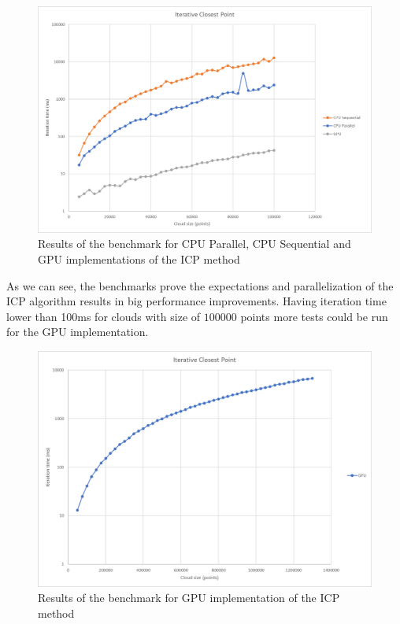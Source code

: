 \documentclass[titlepage]{article}
\begin{document}
\begin{figure}[H]
\includegraphics[width=\textwidth]{ms-icp-1.png}
\caption{Results of the benchmark for CPU Parallel, CPU Sequential and GPU implementations of the ICP method}
\end{figure} 

As we can see, the benchmarks prove the expectations and parallelization of the ICP algorithm results in big performance improvements. Having iteration time lower than 100ms for clouds with size of $100000$ points more tests could be run for the GPU implementation.

\begin{figure}[H]
\includegraphics[width=\textwidth]{ms-icp-2.png}
\caption{Results of the benchmark for GPU implementation of the ICP method}
\end{figure}
\end{document}
